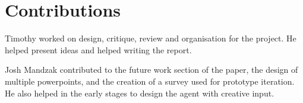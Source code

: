 \documentclass[letterpaper]{article} %
\begin{document}
\section{Contributions}

Timothy worked on design, critique, review and organisation for the project. He helped present ideas and helped writing the report. 

Josh Mandzak contributed to the future work section of the paper, the design of multiple powerpoints, and the creation of a survey used for prototype iteration. He also helped in the early stages to design the agent with creative input.
\end{document}
